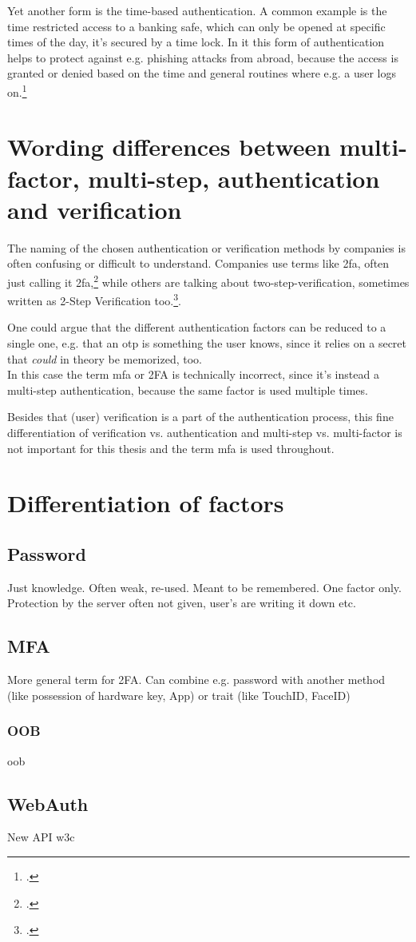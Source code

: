 Yet another form is the time-based authentication. A common example is the time restricted access to a banking safe, which can only be opened at specific times of the day, it's secured by a time lock. In \gls{it} this form of authentication helps to protect against e.g. phishing attacks from abroad, because the access is granted or denied based on the time and general routines where e.g. a user logs on.\footcite[See][191]{dasgupta2017multi}

\section{Wording differences between multi-factor, multi-step, authentication and verification}

The naming of the chosen authentication or verification methods by companies is often confusing or difficult to understand. Companies use terms like \gls{2fa}, often just calling it \gls{2fa},\footcite{apple_2fa} while others are talking about two-step-verification, sometimes written as 2-Step Verification too.\footcites[][]{apple_s2v}[][]{playstation}[][]{google_2-step_verification}[][]{microsoft_2sv}.

One could argue that the different authentication factors can be reduced to a single one, e.g. that an \gls{otp} is \frqq something the user knows\flqq{}, since it relies on a secret that \textit{could} in theory be memorized, too.\\
In this case the term \gls{mfa} or 2FA is technically incorrect, since it's instead a multi-step authentication, because the same factor is used multiple times.

Besides that (user) verification is a part of the authentication process, this fine differentiation of verification vs. authentication and multi-step vs. multi-factor is not important for this thesis and the term \gls{mfa} is used throughout.

\newpage

\section{Differentiation of factors}

\subsection{Password}

Just knowledge. Often weak, re-used. Meant to be remembered. One factor only.\\
Protection by the server often not given, user's are writing it down etc.

\subsection{MFA}

More general term for 2FA. Can combine e.g. password with another method (like possession of hardware key, App) or trait (like TouchID, FaceID)

\subsubsection{OOB}

\gls{oob}

\subsection{WebAuth}

New API \gls{w3c}